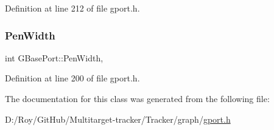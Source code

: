 Definition at line 212 of file gport.\+h.

\mbox{\label{class_g_base_port_a9a76c3a8af8d0e9f29035d02d8f038c1}} 
\subsubsection{\texorpdfstring{Pen\+Width}{PenWidth}}
{\footnotesize\ttfamily int G\+Base\+Port\+::\+Pen\+Width\hspace{0.3cm}{\ttfamily [protected]}, {\ttfamily [inherited]}}



Definition at line 200 of file gport.\+h.



The documentation for this class was generated from the following file\+:\begin{DoxyCompactItemize}
\item 
D\+:/\+Roy/\+Git\+Hub/\+Multitarget-\/tracker/\+Tracker/graph/\mbox{\hyperlink{gport_8h}{gport.\+h}}\end{DoxyCompactItemize}
